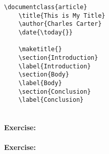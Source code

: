         \begin{verbatim}
\documentclass{article}
    \title{This is My Title}
    \author{Charles Carter}
    \date{\today{}}
 
    \maketitle{}
    \section{Introduction}
    \label{Introduction}
    \section{Body}
    \label{Body}
    \section{Conclusion}
    \label{Conclusion}
    
        \end{verbatim}

        \paragraph{Exercise:}

        \paragraph{Exercise:}


